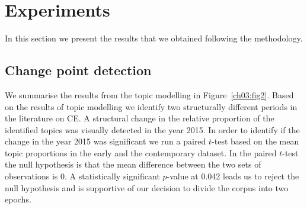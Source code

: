 \documentclass[output=paper]{langsci/langscibook}
\begin{document}
\section{Experiments}\label{ch03:experiments}
In this section we present the results that we obtained following the methodology.

\subsection{Change point detection}
We summarise the results from the topic modelling in Figure~\ref{ch03:fig2}. Based on the results of topic modelling \citep{mahanty2019studying} we identify two structurally different periods in the literature on CE. A structural change in the relative proportion of the identified topics was visually detected in the year 2015. In order to identify if the change in the year 2015 was significant we run a paired $t$-test based on the mean topic proportions in the early and the contemporary dataset. In the paired $t$-test the null hypothesis is that the mean difference between the two sets of observations is 0. A statistically significant $p$-value at 0.042 leads us to reject the null hypothesis and is supportive of our decision to divide the corpus into two epochs.\largerpage[2]
\end{document}
